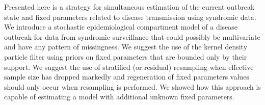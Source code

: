 
Presented here is a strategy for simultaneous estimation of the current outbreak state and fixed parameters related to disease transmission using syndromic data. We introduce a stochastic epidemiological compartment model of a disease outbreak for data from syndromic surveillance that could possibly be multivariate and have any pattern of missingness. 
We suggest the use of the kernel density particle filter \citep{Liu:West:comb:2001} using priors on fixed parameters that are bounded only by their support. We suggest the use of stratified (or residual) resampling when effective sample size has dropped markedly and regeneration of fixed parameters values should only occur when resampling is performed. We showed how this approach is capable of estimating a model with additional unknown fixed parameters. 

